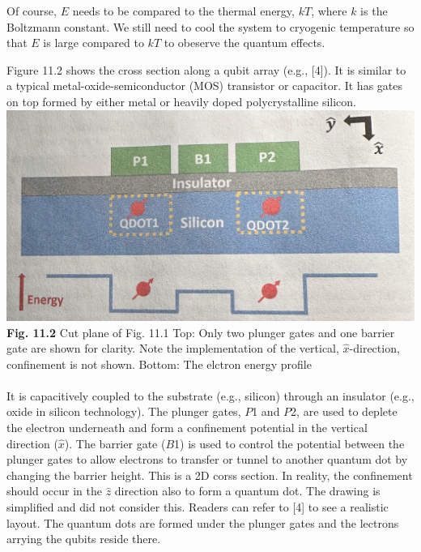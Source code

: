 \documentclass{article}
\begin{document}
Of course, $E$ needs to be compared to the thermal energy, $kT$, where $k$ is the Boltzmann
constant. We still need to cool the system to cryogenic temperature so that $E$ is large
compared to $kT$ to obeserve the quantum effects.

Figure 11.2 shows the cross section along a qubit array (e.g., [4]). It is similar to a typical
metal-oxide-semiconductor (MOS) transistor or capacitor. It has gates on top formed by either metal or heavily doped polycrystalline silicon.\\

\includegraphics[scale=0.45]{Fig.11.2.jpeg}\\
\textbf{Fig. 11.2} Cut plane of Fig. 11.1 Top: Only two plunger gates and one barrier gate are shown for clarity.
Note the implementation of the vertical, $\hat{x}$-direction, confinement is not shown. Bottom: The elctron energy profile\\\\
It is capacitively coupled to the substrate (e.g., silicon) through an insulator (e.g., oxide in silicon technology).
The plunger gates, $P$1 and $P$2, are used to deplete the electron underneath and form a 
confinement potential in the vertical direction ($\hat{x}$). The barrier gate ($B$1) is used to control the potential between the plunger gates
to allow electrons to transfer or tunnel to another quantum dot by changing the barrier height.
This is a 2D corss section. In reality, the confinement should occur in the $\hat{z}$ direction also to form a quantum dot.
The drawing is simplified and did not consider this. Readers can refer to [4] to see a realistic layout. The quantum dots are formed under the plunger
gates and the lectrons arrying the qubits reside there.
\end{document}

